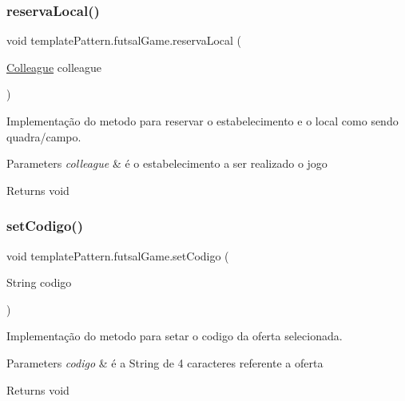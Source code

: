 \subsubsection{\texorpdfstring{reservaLocal()}{reservaLocal()}}
{\footnotesize\ttfamily void template\+Pattern.\+futsal\+Game.\+reserva\+Local (\begin{DoxyParamCaption}\item[{\mbox{\hyperlink{classmediator_pattern_1_1_colleague}{Colleague}}}]{colleague }\end{DoxyParamCaption})}



Implementação do metodo para reservar o estabelecimento e o local como sendo quadra/campo. 


\begin{DoxyParams}{Parameters}
{\em colleague} & é o estabelecimento a ser realizado o jogo \\
\hline
\end{DoxyParams}
\begin{DoxyReturn}{Returns}
void 
\end{DoxyReturn}
\mbox{\label{classtemplate_pattern_1_1futsal_game_a33113d16a67191c453e05d1e634a7eaf}} 
\subsubsection{\texorpdfstring{setCodigo()}{setCodigo()}}
{\footnotesize\ttfamily void template\+Pattern.\+futsal\+Game.\+set\+Codigo (\begin{DoxyParamCaption}\item[{String}]{codigo }\end{DoxyParamCaption})}



Implementação do metodo para setar o codigo da oferta selecionada. 


\begin{DoxyParams}{Parameters}
{\em codigo} & é a String de 4 caracteres referente a oferta \\
\hline
\end{DoxyParams}
\begin{DoxyReturn}{Returns}
void 
\end{DoxyReturn}
\mbox{\label{classtemplate_pattern_1_1futsal_game_a772022311666331f011fe44dc8a6c7c4}} 
